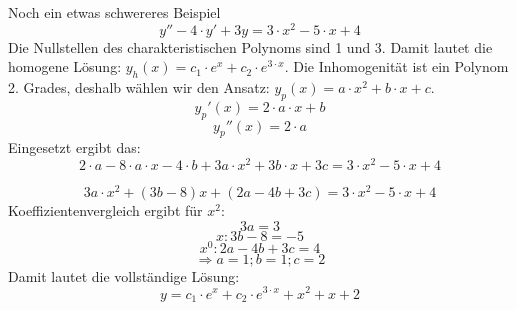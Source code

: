 \documentclass[
	11pt, %
]{beamer}
\begin{document}
\begin{frame}
	\begin{exampleblock}{Noch ein etwas schwereres Beispiel}
		\begin{equation}
			y''-4\cdot y'+3y=3\cdot x^2-5\cdot x+4
		\end{equation}
		Die Nullstellen des charakteristischen Polynoms sind 1 und 3. Damit lautet die homogene L\"osung: $y_h(x)=c_1\cdot e^x+c_2\cdot e^{3\cdot x}$. Die Inhomogenit\"at ist ein Polynom 2. Grades, deshalb w\"ahlen wir den Ansatz: $y_p(x)=a\cdot x^2+b\cdot x+c$.
		\begin{equation}
			y_p'(x)=2\cdot a\cdot x+b
		\end{equation}
		\begin{equation}
			y_p''(x)=2\cdot a
		\end{equation}
		Eingesetzt ergibt das:
		\begin{equation}
			2\cdot a - 8\cdot a\cdot x-4\cdot b+3a\cdot x^2+3b\cdot x+3c = 3\cdot x^2-5\cdot x+4
		\end{equation}
	\end{exampleblock}
\end{frame}
\begin{frame}
	\begin{exampleblock}{}
		\begin{equation}
			3a\cdot x^2+(3b-8)x+(2a-4b+3c)=3\cdot x^2-5\cdot x+4
		\end{equation}
		Koeffizientenvergleich ergibt f\"ur $x^2$:
		\begin{equation}
			3a=3
		\end{equation}
		\begin{equation}
			x: 3b-8=-5
		\end{equation}
		\begin{equation}
			x^0: 2a-4b+3c=4
		\end{equation}
		\begin{equation}
			\Rightarrow a=1; b=1; c=2
		\end{equation}
		Damit lautet die vollst\"andige L\"osung:
		\begin{equation}
		y=c_1\cdot e^x+c_2\cdot e^{3\cdot x}+x^2+x+2
		\end{equation}
	\end{exampleblock}
\end{frame}
\end{document}
